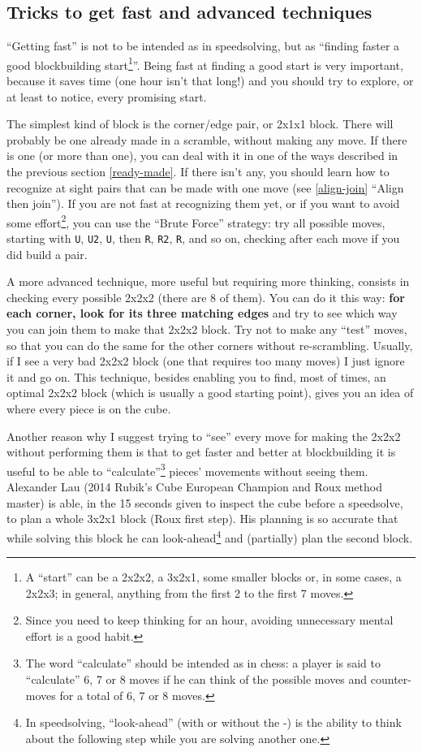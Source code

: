 \documentclass[11pt,a4paper]{book}
\newcommand{\p}{\textquotesingle}
\newcommand{\m}{\texttt}
\begin{document}
\subsection{Tricks to get fast and advanced techniques}

``Getting fast'' is not to be intended as in speedsolving, but as ``finding faster a good blockbuilding start\footnote{A ``start'' can be a 2x2x2, a 3x2x1, some smaller blocks or, in some cases, a 2x2x3; in general, anything from the first 2 to the first 7 moves.}''. Being fast at finding a good start is very important, because it saves time (one hour isn't that long!) and you should try to explore, or at least to notice, every promising start.

The simplest kind of block is the corner/edge pair, or 2x1x1 block. There will probably be one already made in a scramble, without making any move. If there is one (or more than one), you can deal with it in one of the ways described in the previous section \ref{ready-made}. If there isn't any, you should learn how to recognize at sight pairs that can be made with one move (see \ref{align-join} ``Align then join''). If you are not fast at recognizing them yet, or if you want to avoid some effort\footnote{Since you need to keep thinking for an hour, avoiding unnecessary mental effort is a good habit.}, you can use the ``Brute Force'' strategy: try all possible moves, starting with \m U, \m{U2}, \m{U\p}, then \m R, \m{R2}, \m{R\p}, and so on, checking after each move if you did build a pair.

A more advanced technique, more useful but requiring more thinking, consists in checking every possible 2x2x2 (there are 8 of them). You can do it this way: \textbf{for each corner, look for its three matching edges} and try to see which way you can join them to make that 2x2x2 block. Try not to make any ``test'' moves, so that you can do the same for the other corners without re-scrambling. Usually, if I see a very bad 2x2x2 block (one that requires too many moves) I just ignore it and go on. This technique, besides enabling you to find, most of times, an optimal 2x2x2 block (which is usually a good starting point), gives you an idea of where every piece is on the cube.

Another reason why I suggest trying to ``see'' every move for making the 2x2x2 without performing them is that to get faster and better at blockbuilding it is useful to be able to ``calculate''\footnote{The word ``calculate'' should be intended as in chess: a player is said to ``calculate'' 6, 7 or 8 moves if he can think of the possible moves and counter-moves for a total of 6, 7 or 8 moves.} pieces' movements without seeing them. Alexander Lau (2014 Rubik's Cube European Champion and Roux method master) is able, in the 15 seconds given to inspect the cube before a speedsolve, to plan a whole 3x2x1 block (Roux first step). His planning is so accurate that while solving this block he can look-ahead\footnote{In speedsolving, ``look-ahead'' (with or without the -) is the ability to think about the following step while you are solving another one.} and (partially) plan the second block.
\end{document}
